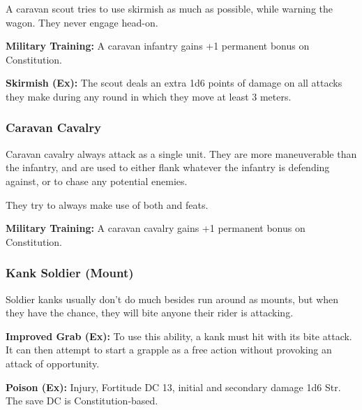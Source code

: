 A caravan scout tries to use skirmish as much as possible, while warning the wagon. They never engage head-on.

\textbf{Military Training:} A caravan infantry gains +1 permanent bonus on Constitution.

\textbf{Skirmish (Ex):} The scout deals an extra 1d6 points of damage on all attacks they make during any round in which they move at least 3 meters.


\subsubsection{Caravan Cavalry}

Caravan cavalry always attack as a single unit. They are more maneuverable than the infantry, and are used to either flank whatever the infantry is defending against, or to chase any potential enemies.

They try to always make use of both  and  feats.

\textbf{Military Training:} A caravan cavalry gains +1 permanent bonus on Constitution.

\subsubsection{Kank Soldier (Mount)}

Soldier kanks usually don't do much besides run around as mounts, but when they have the chance, they will bite anyone their rider is attacking.

\textbf{Improved Grab (Ex):} To use this ability, a kank must hit with its bite attack. It can then attempt to start a grapple as a free action without provoking an attack of opportunity.

\textbf{Poison (Ex):} Injury, Fortitude DC 13, initial and secondary damage 1d6 Str. The save DC is Constitution-based.


